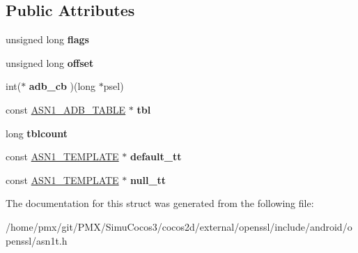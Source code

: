 \subsection*{Public Attributes}
\begin{DoxyCompactItemize}
\item 
\mbox{\label{structASN1__ADB__st_a54eb419e2b98aef6bdb2eb51f6cc1e64}} 
unsigned long {\bfseries flags}
\item 
\mbox{\label{structASN1__ADB__st_a62226ed62585729d4c60b6a238e4c10a}} 
unsigned long {\bfseries offset}
\item 
\mbox{\label{structASN1__ADB__st_a167163a75a4cf09f967c45b383b7a38f}} 
int($\ast$ {\bfseries adb\+\_\+cb} )(long $\ast$psel)
\item 
\mbox{\label{structASN1__ADB__st_a23109fd6d4d43d9076fb9bf53f1a4951}} 
const \hyperlink{structASN1__ADB__TABLE__st}{A\+S\+N1\+\_\+\+A\+D\+B\+\_\+\+T\+A\+B\+LE} $\ast$ {\bfseries tbl}
\item 
\mbox{\label{structASN1__ADB__st_a329d8b9d61abbc5fed3507e68f21c656}} 
long {\bfseries tblcount}
\item 
\mbox{\label{structASN1__ADB__st_a8cab715495fe8d3a6ba26b01cc574176}} 
const \hyperlink{structASN1__TEMPLATE__st}{A\+S\+N1\+\_\+\+T\+E\+M\+P\+L\+A\+TE} $\ast$ {\bfseries default\+\_\+tt}
\item 
\mbox{\label{structASN1__ADB__st_a0350ffc8d1c61259778eb90068ebd424}} 
const \hyperlink{structASN1__TEMPLATE__st}{A\+S\+N1\+\_\+\+T\+E\+M\+P\+L\+A\+TE} $\ast$ {\bfseries null\+\_\+tt}
\end{DoxyCompactItemize}


The documentation for this struct was generated from the following file\+:\begin{DoxyCompactItemize}
\item 
/home/pmx/git/\+P\+M\+X/\+Simu\+Cocos3/cocos2d/external/openssl/include/android/openssl/asn1t.\+h\end{DoxyCompactItemize}
